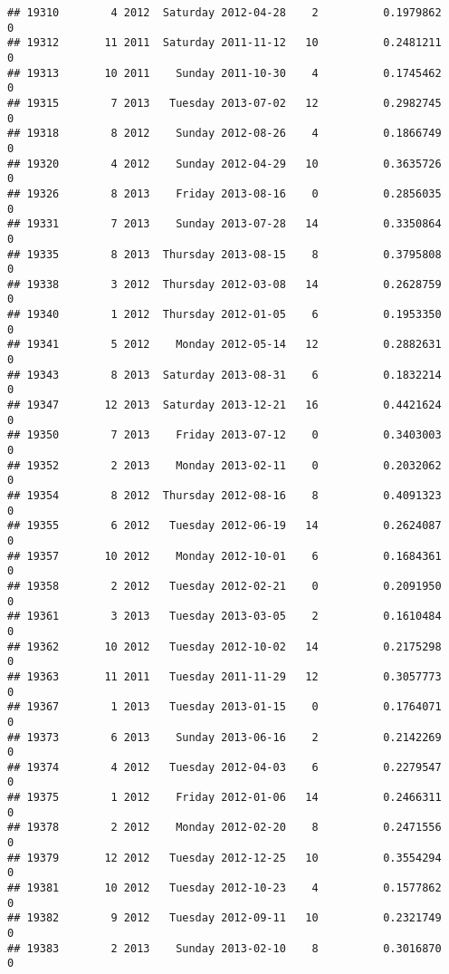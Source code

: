 \documentclass[
]{article}
\begin{document}
\begin{verbatim}
## 19310        4 2012  Saturday 2012-04-28    2          0.1979862             0
## 19312       11 2011  Saturday 2011-11-12   10          0.2481211             0
## 19313       10 2011    Sunday 2011-10-30    4          0.1745462             0
## 19315        7 2013   Tuesday 2013-07-02   12          0.2982745             0
## 19318        8 2012    Sunday 2012-08-26    4          0.1866749             0
## 19320        4 2012    Sunday 2012-04-29   10          0.3635726             0
## 19326        8 2013    Friday 2013-08-16    0          0.2856035             0
## 19331        7 2013    Sunday 2013-07-28   14          0.3350864             0
## 19335        8 2013  Thursday 2013-08-15    8          0.3795808             0
## 19338        3 2012  Thursday 2012-03-08   14          0.2628759             0
## 19340        1 2012  Thursday 2012-01-05    6          0.1953350             0
## 19341        5 2012    Monday 2012-05-14   12          0.2882631             0
## 19343        8 2013  Saturday 2013-08-31    6          0.1832214             0
## 19347       12 2013  Saturday 2013-12-21   16          0.4421624             0
## 19350        7 2013    Friday 2013-07-12    0          0.3403003             0
## 19352        2 2013    Monday 2013-02-11    0          0.2032062             0
## 19354        8 2012  Thursday 2012-08-16    8          0.4091323             0
## 19355        6 2012   Tuesday 2012-06-19   14          0.2624087             0
## 19357       10 2012    Monday 2012-10-01    6          0.1684361             0
## 19358        2 2012   Tuesday 2012-02-21    0          0.2091950             0
## 19361        3 2013   Tuesday 2013-03-05    2          0.1610484             0
## 19362       10 2012   Tuesday 2012-10-02   14          0.2175298             0
## 19363       11 2011   Tuesday 2011-11-29   12          0.3057773             0
## 19367        1 2013   Tuesday 2013-01-15    0          0.1764071             0
## 19373        6 2013    Sunday 2013-06-16    2          0.2142269             0
## 19374        4 2012   Tuesday 2012-04-03    6          0.2279547             0
## 19375        1 2012    Friday 2012-01-06   14          0.2466311             0
## 19378        2 2012    Monday 2012-02-20    8          0.2471556             0
## 19379       12 2012   Tuesday 2012-12-25   10          0.3554294             0
## 19381       10 2012   Tuesday 2012-10-23    4          0.1577862             0
## 19382        9 2012   Tuesday 2012-09-11   10          0.2321749             0
## 19383        2 2013    Sunday 2013-02-10    8          0.3016870             0

\end{verbatim}
\end{document}

